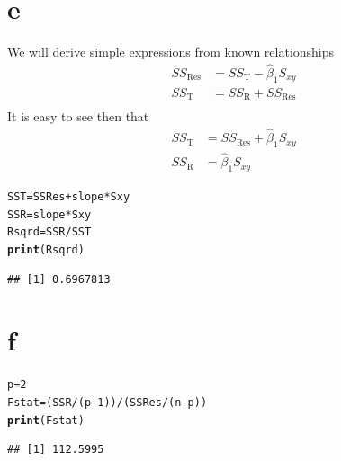 \documentclass{article}\usepackage[]{graphicx}\usepackage[]{color}
\makeatletter
\newcommand{\hlnum}[1]{\textcolor[rgb]{0.686,0.059,0.569}{#1}}%
\newcommand{\hlopt}[1]{\textcolor[rgb]{0,0,0}{#1}}%
\newcommand{\hlstd}[1]{\textcolor[rgb]{0.345,0.345,0.345}{#1}}%
\newcommand{\hlkwb}[1]{\textcolor[rgb]{0.69,0.353,0.396}{#1}}%
\newcommand{\hlkwd}[1]{\textcolor[rgb]{0.737,0.353,0.396}{\textbf{#1}}}%
\newenvironment{kframe}{%
 \def\at@end@of@kframe{}%
 \ifinner\ifhmode%
  \def\at@end@of@kframe{\end{minipage}}%
  \begin{minipage}{\columnwidth}%
 \fi\fi%
 \def\FrameCommand##1{\hskip\@totalleftmargin \hskip-\fboxsep
 \colorbox{shadecolor}{##1}\hskip-\fboxsep
     \hskip-\linewidth \hskip-\@totalleftmargin \hskip\columnwidth}%
 \MakeFramed {\advance\hsize-\width
   \@totalleftmargin\z@ \linewidth\hsize
   \@setminipage}}%
 {\par\unskip\endMakeFramed%
 \at@end@of@kframe}
\newenvironment{knitrout}{}{} %
\makeatother
\begin{document}
\clearpage

\section*{e}


We will derive simple expressions from known relationships
	\begin{align*}
		SS_{\mathrm{Res}} &= SS_{\mathrm{T}} - \hat{\beta}_1 S_{xy}\\
		SS_{\mathrm{T}} &= SS_{\mathrm{R}} + SS_{\mathrm{Res}}\\ 
	\end{align*}
It is easy to see then that 
	\begin{align*}
		SS_{\mathrm{T}} &= SS_{\mathrm{Res}} + \hat \beta _1 S_{xy}\\
		SS_{\mathrm{R}} &=   \hat \beta _1 S_{xy}
	\end{align*}
	
	
\begin{knitrout}
\color{fgcolor}\begin{kframe}
\begin{alltt}
\hlstd{SST} \hlkwb{=} \hlstd{SSRes} \hlopt{+} \hlstd{slope}\hlopt{*}\hlstd{Sxy}
\hlstd{SSR} \hlkwb{=} \hlstd{slope}\hlopt{*}\hlstd{Sxy}
\hlstd{Rsqrd} \hlkwb{=} \hlstd{SSR}\hlopt{/}\hlstd{SST}
\hlkwd{print}\hlstd{(Rsqrd)}
\end{alltt}
\begin{verbatim}
## [1] 0.6967813
\end{verbatim}
\end{kframe}
\end{knitrout}


\section*{f}

\begin{knitrout}
\color{fgcolor}\begin{kframe}
\begin{alltt}
\hlstd{p} \hlkwb{=} \hlnum{2}
\hlstd{Fstat} \hlkwb{=} \hlstd{(SSR}\hlopt{/}\hlstd{(p}\hlopt{-}\hlnum{1}\hlstd{))}\hlopt{/}\hlstd{(SSRes}\hlopt{/}\hlstd{(n}\hlopt{-}\hlstd{p))}
\hlkwd{print}\hlstd{(Fstat)}
\end{alltt}
\begin{verbatim}
## [1] 112.5995
\end{verbatim}
\end{kframe}
\end{knitrout}
\clearpage
\end{document}
